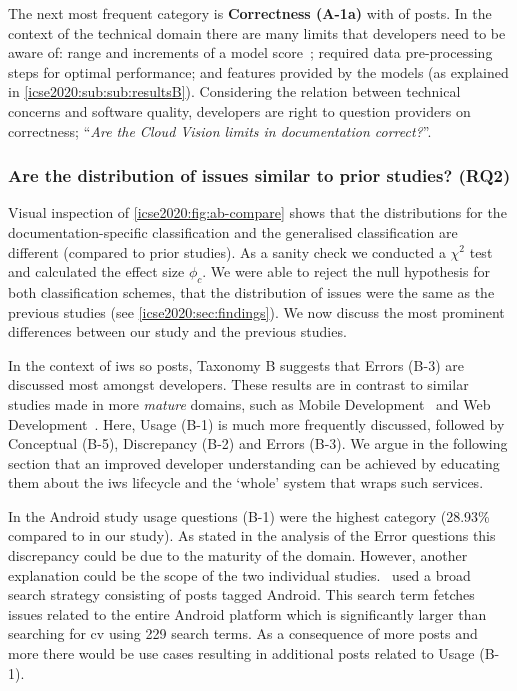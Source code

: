 The next most frequent category is \textbf{Correctness (A-1a)} with \PctTaxACorrectness{} of posts. In the context of the technical domain there are many limits that developers need to be aware of: range and increments of a model score~\citep{Cummaudo:2019icsme}; required data pre-processing steps for optimal performance; and features provided by the models (as explained in \cref{icse2020:sub:sub:resultsB}). Considering the relation between technical concerns and software quality, developers are right to question providers on correctness; ``\textit{Are the Cloud Vision  limits in documentation correct?}''.

\subsubsection{Are the distribution of issues similar to prior studies? (RQ2)}
Visual inspection of \cref{icse2020:fig:ab-compare} shows that the distributions for the documentation-specific classification and the generalised classification are different (compared to prior studies). As a sanity check we conducted a $\chi^2$ test and calculated the effect size $\phi_c$. We were able to reject the null hypothesis for both classification schemes, that the distribution of issues were the same as the previous studies (see \cref{icse2020:sec:findings}). We now discuss the most prominent differences between our study and the previous studies.

%
%

%
%

%

In the context of \gls{iws} \gls{so} posts, Taxonomy B suggests that Errors (B-3) are discussed most amongst developers. These results are in contrast to similar studies made in more \textit{mature}  domains, such as Mobile Development~\citep{Beyer:2018fm,Beyer:2014ec,Rosen:2016uk, Barnett:2015ec, Barnett:2015ut} and Web Development~\citep{Treude:2011fh}. Here,  Usage (B-1) is much more frequently discussed, followed by Conceptual (B-5), Discrepancy (B-2) and Errors (B-3). We argue in the following section that an improved developer understanding can be achieved by educating them about the \gls{iws} lifecycle and the `whole' system that wraps such services.

In the Android study  usage questions (B-1) were the highest category (28.93\% compared to \PctTaxBAPIUsage{} in our study). As stated in the analysis of the Error questions this discrepancy could be due to the maturity of the domain. However, another explanation could be the scope of the two individual studies.~\citet{Beyer:2018fm} used a broad search strategy consisting of posts tagged Android. This search term fetches issues related to the entire Android platform which is significantly larger than searching for \gls{cv}  using 229 search terms. As a consequence of more posts and more  there would be use cases resulting in additional posts related to  Usage (B-1).

